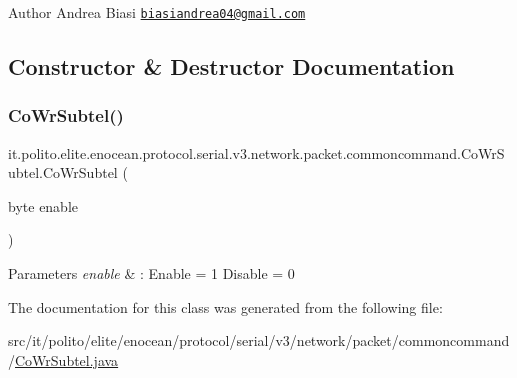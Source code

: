 \begin{DoxyAuthor}{Author}
Andrea Biasi \href{mailto:biasiandrea04@gmail.com}{\tt biasiandrea04@gmail.\+com} 
\end{DoxyAuthor}


\subsection{Constructor \& Destructor Documentation}
\hypertarget{classit_1_1polito_1_1elite_1_1enocean_1_1protocol_1_1serial_1_1v3_1_1network_1_1packet_1_1commoncommand_1_1_co_wr_subtel_a5ab3d9770286b2470e1174b5befb6e35}{}\label{classit_1_1polito_1_1elite_1_1enocean_1_1protocol_1_1serial_1_1v3_1_1network_1_1packet_1_1commoncommand_1_1_co_wr_subtel_a5ab3d9770286b2470e1174b5befb6e35} 
\subsubsection{\texorpdfstring{Co\+Wr\+Subtel()}{CoWrSubtel()}}
{\footnotesize\ttfamily it.\+polito.\+elite.\+enocean.\+protocol.\+serial.\+v3.\+network.\+packet.\+commoncommand.\+Co\+Wr\+Subtel.\+Co\+Wr\+Subtel (\begin{DoxyParamCaption}\item[{byte}]{enable }\end{DoxyParamCaption})}


\begin{DoxyParams}{Parameters}
{\em enable} & \+: Enable = 1 Disable = 0 \\
\hline
\end{DoxyParams}


The documentation for this class was generated from the following file\+:\begin{DoxyCompactItemize}
\item 
src/it/polito/elite/enocean/protocol/serial/v3/network/packet/commoncommand/\hyperlink{_co_wr_subtel_8java}{Co\+Wr\+Subtel.\+java}\end{DoxyCompactItemize}
